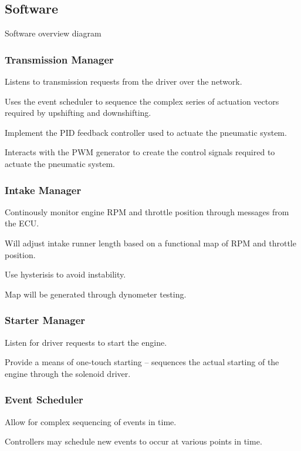 \subsection{Software}

Software overview diagram


\subsubsection{Transmission Manager}

Listens to transmission requests from the driver over the network.

Uses the event scheduler to sequence the complex series of actuation vectors required by upshifting and downshifting.

Implement the PID feedback controller used to actuate the pneumatic system.

Interacts with the PWM generator to create the control signals required to actuate the pneumatic system.


\subsubsection{Intake Manager}

Continously monitor engine RPM and throttle position through messages from the ECU.

Will adjust intake runner length based on a functional map of RPM and throttle position.

Use hysterisis to avoid instability.

Map will be generated through dynometer testing.


\subsubsection{Starter Manager}

Listen for driver requests to start the engine.

Provide a means of one-touch starting -- sequences the actual starting of the engine through the solenoid driver. 


\subsubsection{Event Scheduler}

Allow for complex sequencing of events in time.

Controllers may schedule new events to occur at various points in time.

